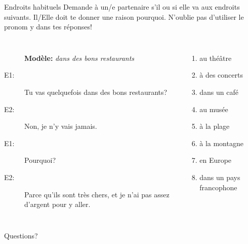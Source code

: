 \documentclass{beamer}
\begin{document}
  \begin{frame}{Endroits habituels}
    Demande à un/e partenaire s'il ou si elle va aux endroits suivants.
    Il/Elle doit te donner une raison pourquoi.
    \alert{N'oublie pas} d'utiliser le pronom \alert{y} dans tes réponses!
    \begin{columns}[t]
        \begin{description}
          \item[] \textbf{Modèle:} \textit{dans des bons restaurants}
          \item[E1:] Tu vas quelquefois dans des bons restaurants?
          \item[E2:] Non, je n'\alert{y} vais jamais.
          \item[E1:] Pourquoi?
          \item[E2:] Parce qu'ils sont très chers, et je n'ai pas assez d'argent pour \alert{y} aller.
        \end{description}
        \begin{enumerate}
          \item au théâtre
          \item à des concerts
          \item dans un café
          \item au musée
          \item à la plage
          \item à la montagne
          \item en Europe
          \item dans un pays francophone
        \end{enumerate}
    \end{columns}
  \end{frame}

  \begin{frame}{}
    \begin{center}
      \Large Questions?
    \end{center}
  \end{frame}
\end{document}
